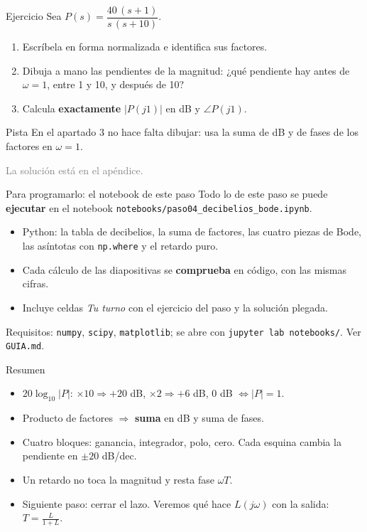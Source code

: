 \documentclass[aspectratio=169,11pt]{beamer}
\begin{document}
\begin{frame}{Ejercicio}
  \small
  Sea $P(s)=\dfrac{40\,(s+1)}{s\,(s+10)}$.
  \begin{enumerate}
    \item Escríbela en forma normalizada e identifica sus factores.
    \item Dibuja a mano las pendientes de la magnitud: ¿qué pendiente hay antes de $\omega=1$, entre 1 y 10, y después de 10?
    \item Calcula \textbf{exactamente} $|P(j1)|$ en dB y $\angle P(j1)$.
  \end{enumerate}
  \begin{block}{Pista}
    En el apartado 3 no hace falta dibujar: usa la suma de dB y de fases de los factores en $\omega=1$.
  \end{block}
  \textcolor{gray}{La solución está en el apéndice.}
\end{frame}

\begin{frame}{Para programarlo: el notebook de este paso}
  \small
  Todo lo de este paso se puede \textbf{ejecutar} en el notebook \texttt{notebooks/paso04\_decibelios\_bode.ipynb}.
  \begin{itemize}
    \item Python: la tabla de decibelios, la suma de factores, las cuatro piezas de Bode, las asíntotas con \texttt{np.where} y el retardo puro.
    \item Cada cálculo de las diapositivas se \textbf{comprueba} en código, con las mismas cifras.
    \item Incluye celdas \emph{Tu turno} con el ejercicio del paso y la solución plegada.
  \end{itemize}
  \footnotesize Requisitos: \texttt{numpy}, \texttt{scipy}, \texttt{matplotlib}; se abre con \texttt{jupyter lab notebooks/}. Ver \texttt{GUIA.md}.
\end{frame}

\begin{frame}{Resumen}
  \small
  \begin{itemize}
    \item $20\log_{10}|P|$: $\times10\Rightarrow+20$ dB, $\times2\Rightarrow+6$ dB, $0$ dB $\Leftrightarrow|P|=1$.
    \item Producto de factores $\Rightarrow$ \textbf{suma} en dB y suma de fases.
    \item Cuatro bloques: ganancia, integrador, polo, cero. Cada esquina cambia la pendiente en $\pm20$ dB/dec.
    \item Un retardo no toca la magnitud y resta fase $\omega T$.
    \item Siguiente paso: cerrar el lazo. Veremos qué hace $L(j\omega)$ con la salida: $T=\frac{L}{1+L}$.
  \end{itemize}
\end{frame}
\end{document}

